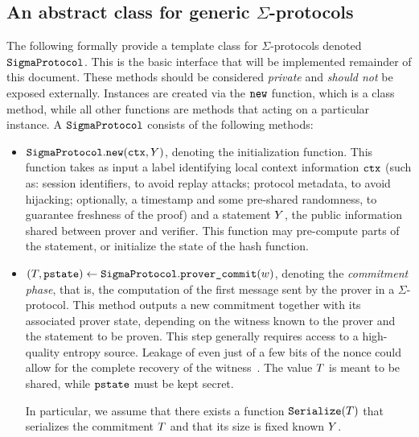 \documentclass[11pt]{article}
\begin{document}
\subsection{An abstract class for generic $\Sigma$-protocols}
The following formally provide a template class for $\Sigma$-protocols denoted $\texttt{SigmaProtocol}$. This is the basic interface that will be implemented remainder of this document.
These methods should be considered \emph{private} and \emph{should not} be exposed externally.
Instances are created via the $\texttt{new}$ function, which is a class method, while all other functions are methods that acting on a particular instance.
A $\texttt{SigmaProtocol}$ consists of the following methods:
      \begin{itemize}
        \item $\texttt{SigmaProtocol}.\texttt{new}(\texttt{ctx}, Y)$,
        denoting the initialization function. This function takes as input a label identifying local context information $\texttt{ctx}$ (such as: session identifiers, to avoid replay attacks; protocol metadata, to avoid hijacking; optionally, a timestamp and some pre-shared randomness, to guarantee freshness of the proof) and a statement $Y$,  the public information shared between prover and verifier.
        This function may pre-compute parts of the statement, or initialize the state of the hash function.
        \item
          $(T, \texttt{pstate})\gets \texttt{SigmaProtocol}.\texttt{prover\_commit}(w)$,
          denoting the \emph{commitment phase}, that is, the computation of the first message sent by the prover in a $\Sigma$-protocol. This method outputs a new commitment together with its associated prover state, depending on the witness known to the prover and the statement to be proven.
          This step generally requires access to a high-quality entropy source.
          Leakage of even just of a few bits of the nonce could allow for the complete recovery of the witness~\cite{lattice-attack,bleichenbacher,CCS:ANTTY20}.
					The value $T$ is meant to be shared, while $\texttt{pstate}$ must be kept secret.

          In particular, we assume that there exists a function $\texttt{Serialize}(T)$ that serializes the commitment $T$ and that its size is fixed known $Y$.


\end{itemize}
\end{document}
